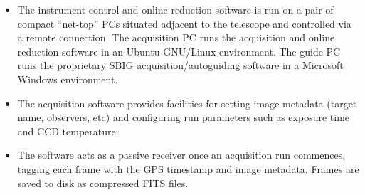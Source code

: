 \vspace{-1.75cm}
\begin{itemize}[itemsep=20pt]
\item[] The instrument control and online reduction software is run on a pair of
compact ``net-top'' PCs situated adjacent to the telescope and controlled via a remote
connection. The acquisition PC runs the acquisition and online reduction software
in an Ubuntu GNU/Linux environment. The guide PC runs the proprietary SBIG
acquisition/autoguiding software in a Microsoft Windows environment.

\item[] The acquisition software provides facilities for setting image metadata
(target name, observers, etc) and configuring run parameters such as exposure
time and CCD temperature.

\item[] The software acts as a passive receiver once an acquisition run
commences, tagging each frame with the GPS timestamp and image metadata. 
Frames are saved to disk as compressed FITS files.

\end{itemize}
\vspace{-1.75cm}